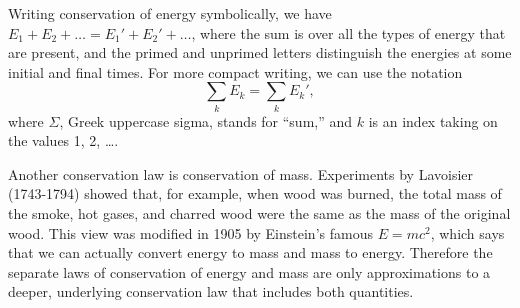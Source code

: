 Writing conservation of energy symbolically, we have
$E_1+E_2+\ldots=E_1'+E_2'+\ldots$, where the sum is over all the types
of energy that are present, and the primed and unprimed letters distinguish the energies at some
initial and final times. For more compact writing, we can use the notation
\begin{equation}
  \sum_k E_k = \sum_k E_k',
\end{equation}
where $\Sigma$, Greek uppercase sigma, stands for ``sum,'' and $k$ is an index taking
on the values 1, 2, \ldots.

Another conservation law is conservation of mass. Experiments by Lavoisier (1743-1794)
showed that, for example, when wood was burned, the total mass of the smoke, hot gases,
and charred wood were the same as the mass of the original wood.
This view was modified in 1905 by Einstein's famous
$E=mc^2$, which says that we can actually convert energy to mass and mass to energy.
Therefore the separate laws of conservation of energy and mass are only approximations
to a deeper, underlying conservation law that includes both quantities.
